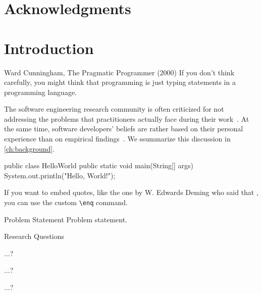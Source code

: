 \documentclass[
    pdftex,
    final,
    11pt,
    a4paper,
    parskip=false, %
    twoside, %
    footheight=0mm, %
    footinclude=false,
    toc=bibliography, %
    toc=listof %
]{scrbook} %
\begin{document}
\chapter*{Acknowledgments}

\lipsum[1-4]

\tableofcontents

\clearpage

\mainmatter %

\chapter{Introduction}
\label{ch:introduction}

\begin{chapter-quotation}{Ward Cunningham, The Pragmatic Programmer (2000)}
If you don't think carefully, you might think that programming is just typing statements in a programming language.
\end{chapter-quotation} 

The software engineering research community is often criticized for not addressing the problems that practitioners actually face during their work~\cite{Briand2012}.
At the same time, software developers' beliefs are rather based on their personal experience than on empirical findings~\cite{DevanbuZimmermannOthers2016}.
We s\textsf{s}ummarize this discussion in \autoref{ch:background}.

\begin{java}
public class HelloWorld {
  public static void main(String[] args) {
    System.out.println("Hello, World!");
  }
}
\end{java}

If you want to embed quotes, like the one by W. Edwards Deming who said that , you can use the custom \texttt{\textbackslash enq} command.


\begin{graybox}{Problem Statement}
Problem statement.
\end{graybox}


\begin{graybox}{Research Questions}
\begin{description}[style=multiline, labelindent=\parindent, leftmargin=\rqindent, itemsep=-1ex]
\item[RQ1] ...?
\item[RQ2] ...?
\item[RQ3] ...?
\end{description}
\end{graybox}
\end{document}
